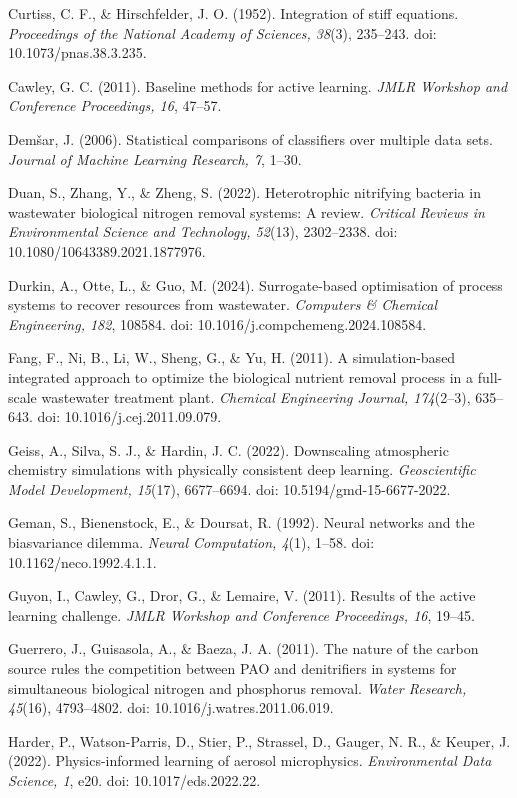 \documentclass[a4paper,fleqn]{cas-sc}
\begin{document}
\noindent Curtiss, C. F., \& Hirschfelder, J. O. (1952). Integration of stiff equations. \textit{Proceedings of the National Academy of Sciences, 38}(3), 235--243. doi: 10.1073/pnas.38.3.235.

\noindent Cawley, G. C. (2011). Baseline methods for active learning. \textit{JMLR Workshop and Conference Proceedings, 16}, 47--57.

\noindent Dem\v{s}ar, J. (2006). Statistical comparisons of classifiers over multiple data sets. \textit{Journal of Machine Learning Research, 7}, 1--30.

\noindent Duan, S., Zhang, Y., \& Zheng, S. (2022). Heterotrophic nitrifying bacteria in wastewater biological nitrogen removal systems: A review. \textit{Critical Reviews in Environmental Science and Technology, 52}(13), 2302--2338. doi: 10.1080/10643389.2021.1877976.

\noindent Durkin, A., Otte, L., \& Guo, M. (2024). Surrogate-based optimisation of process systems to recover resources from wastewater. \textit{Computers \& Chemical Engineering, 182}, 108584. doi: 10.1016/j.compchemeng.2024.108584.

\noindent Fang, F., Ni, B., Li, W., Sheng, G., \& Yu, H. (2011). A simulation-based integrated approach to optimize the biological nutrient removal process in a full-scale wastewater treatment plant. \textit{Chemical Engineering Journal, 174}(2--3), 635--643. doi: 10.1016/j.cej.2011.09.079.

\noindent Geiss, A., Silva, S. J., \& Hardin, J. C. (2022). Downscaling atmospheric chemistry simulations with physically consistent deep learning. \textit{Geoscientific Model Development, 15}(17), 6677--6694. doi: 10.5194/gmd-15-6677-2022.

\noindent Geman, S., Bienenstock, E., \& Doursat, R. (1992). Neural networks and the bias\/variance dilemma. \textit{Neural Computation, 4}(1), 1--58. doi: 10.1162/neco.1992.4.1.1.

\noindent Guyon, I., Cawley, G., Dror, G., \& Lemaire, V. (2011). Results of the active learning challenge. \textit{JMLR Workshop and Conference Proceedings, 16}, 19--45.

\noindent Guerrero, J., Guisasola, A., \& Baeza, J. A. (2011). The nature of the carbon source rules the competition between PAO and denitrifiers in systems for simultaneous biological nitrogen and phosphorus removal. \textit{Water Research, 45}(16), 4793--4802. doi: 10.1016/j.watres.2011.06.019.

\noindent Harder, P., Watson-Parris, D., Stier, P., Strassel, D., Gauger, N. R., \& Keuper, J. (2022). Physics-informed learning of aerosol microphysics. \textit{Environmental Data Science, 1}, e20. doi: 10.1017/eds.2022.22.
\end{document}
